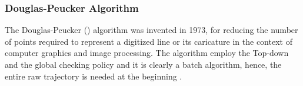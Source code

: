 \vspace{-1ex}
\subsubsection{Douglas-Peucker Algorithm}



The Douglas-Peucker (\dpa) algorithm \cite{Douglas:Peucker} was invented in 1973, for reducing the number of points required to represent a digitized line or its caricature in the context of computer graphics and image processing.
The \dpa algorithm employ the Top-down and the global checking policy and it is clearly a batch algorithm, hence, the entire raw trajectory is needed at the beginning \cite{Meratnia:Spatiotemporal}.

